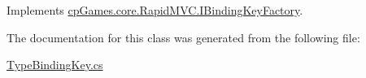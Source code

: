 Implements \mbox{\hyperlink{interfacecp_games_1_1core_1_1_rapid_m_v_c_1_1_i_binding_key_factory_acebadb5b1ee05c449b3872428ce554ff}{cp\+Games.\+core.\+Rapid\+M\+V\+C.\+I\+Binding\+Key\+Factory}}.



The documentation for this class was generated from the following file\+:\begin{DoxyCompactItemize}
\item 
\mbox{\hyperlink{_type_binding_key_8cs}{Type\+Binding\+Key.\+cs}}\end{DoxyCompactItemize}
